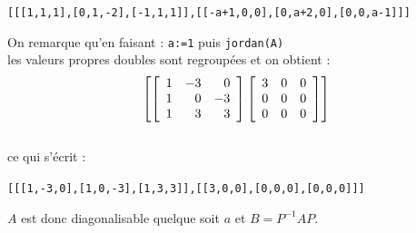 \documentclass{article}
\begin{document}
\begin{giacjshere}
\begin{enumerate}
\begin{center}
{\tt [[[1,1,1],[0,1,-2],[-1,1,1]],[[-a+1,0,0],[0,a+2,0],[0,0,a-1]]]}
\end{center}
On remarque qu'en faisant : {\tt a:=1} puis {\tt jordan(A)} \\
les valeurs propres doubles sont regroup\'ees et on obtient :
$$ {\tt \left[ \left[ 
\begin{array}{rrr}
1 & -3 & 0\\
1 & 0 & -3\\
1 & 3 & 3
\end{array}
\right] 
\left[\begin{array}{ccc}
3 & 0 & 0\\
0 & 0 & 0\\
0 & 0 & 0
\end{array}
\right] 
\right]}$$\\
ce qui s'\'ecrit :
\begin{center}
{\tt [[[1,-3,0],[1,0,-3],[1,3,3]],[[3,0,0],[0,0,0],[0,0,0]]]}
\end{center}
$A$ est donc diagonalisable quelque soit $a$ et $B=P^{-1}AP$.
\end{enumerate}

\pagebreak




\end{giacjshere}
\end{document}
